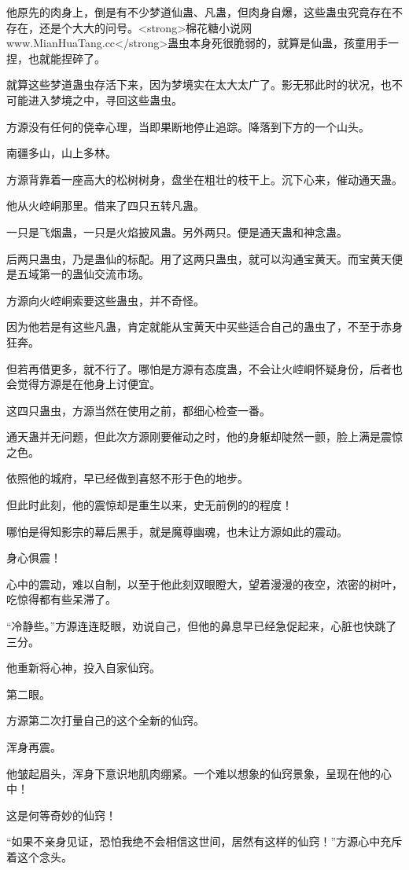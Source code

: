 \begin{this_body}
他原先的肉身上，倒是有不少梦道仙蛊、凡蛊，但肉身自爆，这些蛊虫究竟存在不存在，还是个大大的问号。<strong>棉花糖小说网www.MianHuaTang.cc</strong>蛊虫本身死很脆弱的，就算是仙蛊，孩童用手一捏，也就能捏碎了。

就算这些梦道蛊虫存活下来，因为梦境实在太大太广了。影无邪此时的状况，也不可能进入梦境之中，寻回这些蛊虫。

方源没有任何的侥幸心理，当即果断地停止追踪。降落到下方的一个山头。

南疆多山，山上多林。

方源背靠着一座高大的松树树身，盘坐在粗壮的枝干上。沉下心来，催动通天蛊。

他从火崆峒那里。借来了四只五转凡蛊。

一只是飞烟蛊，一只是火焰披风蛊。另外两只。便是通天蛊和神念蛊。

后两只蛊虫，乃是蛊仙的标配。用了这两只蛊虫，就可以沟通宝黄天。而宝黄天便是五域第一的蛊仙交流市场。

方源向火崆峒索要这些蛊虫，并不奇怪。

因为他若是有这些凡蛊，肯定就能从宝黄天中买些适合自己的蛊虫了，不至于赤身狂奔。

但若再借更多，就不行了。哪怕是方源有态度蛊，不会让火崆峒怀疑身份，后者也会觉得方源是在他身上讨便宜。

这四只蛊虫，方源当然在使用之前，都细心检查一番。

通天蛊并无问题，但此次方源刚要催动之时，他的身躯却陡然一颤，脸上满是震惊之色。

依照他的城府，早已经做到喜怒不形于色的地步。

但此时此刻，他的震惊却是重生以来，史无前例的的程度！

哪怕是得知影宗的幕后黑手，就是魔尊幽魂，也未让方源如此的震动。

身心俱震！

心中的震动，难以自制，以至于他此刻双眼瞪大，望着漫漫的夜空，浓密的树叶，吃惊得都有些呆滞了。

“冷静些。”方源连连眨眼，劝说自己，但他的鼻息早已经急促起来，心脏也快跳了三分。

他重新将心神，投入自家仙窍。

第二眼。

方源第二次打量自己的这个全新的仙窍。

浑身再震。

他皱起眉头，浑身下意识地肌肉绷紧。一个难以想象的仙窍景象，呈现在他的心中！

这是何等奇妙的仙窍！

“如果不亲身见证，恐怕我绝不会相信这世间，居然有这样的仙窍！”方源心中充斥着这个念头。


\end{this_body}
